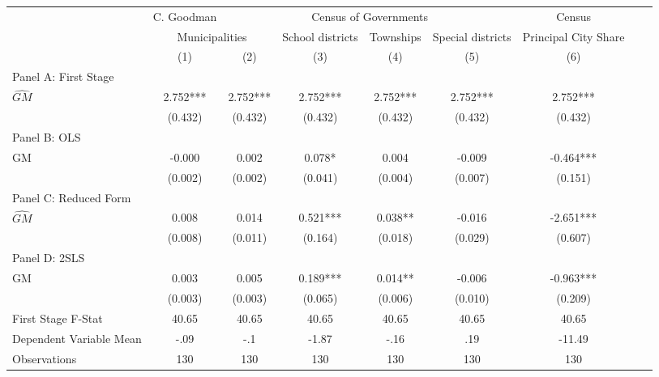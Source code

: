  \begin{tabular}{l*{8}{c}} \toprule
&\multicolumn{1}{c}{C. Goodman}&\multicolumn{4}{c}{Census of Governments}&\multicolumn{1}{c}{Census}\\\cmidrule(lr){2-2}\cmidrule(lr){3-6}\cmidrule(lr){7-7}
&\multicolumn{2}{c}{Municipalities}&\multicolumn{1}{c}{School districts}&\multicolumn{1}{c}{Townships}&\multicolumn{1}{c}{Special districts}&\multicolumn{1}{c}{Principal City Share}\\\cmidrule(lr){2-3}\cmidrule(lr){4-6}\cmidrule(lr){7-7}
&\multicolumn{1}{c}{(1)}&\multicolumn{1}{c}{(2)}&\multicolumn{1}{c}{(3)}&\multicolumn{1}{c}{(4)}&\multicolumn{1}{c}{(5)}&\multicolumn{1}{c}{(6)}\\
\cmidrule(lr){1-7}
\multicolumn{6}{l}{Panel A: First Stage}\\
\cmidrule(lr){1-7}
$\widehat{GM}$  &    2.752***&    2.752***&    2.752***&    2.752***&    2.752***&    2.752***\\
                &  (0.432)   &  (0.432)   &  (0.432)   &  (0.432)   &  (0.432)   &  (0.432)   \\
\cmidrule(lr){1-7}
\multicolumn{6}{l}{Panel B: OLS}\\
\cmidrule(lr){1-7}
GM              &   -0.000   &    0.002   &    0.078*  &    0.004   &   -0.009   &   -0.464***\\
                &  (0.002)   &  (0.002)   &  (0.041)   &  (0.004)   &  (0.007)   &  (0.151)   \\
\cmidrule(lr){1-7}
\multicolumn{6}{l}{Panel C: Reduced Form}\\
\cmidrule(lr){1-7}
$\widehat{GM}$  &    0.008   &    0.014   &    0.521***&    0.038** &   -0.016   &   -2.651***\\
                &  (0.008)   &  (0.011)   &  (0.164)   &  (0.018)   &  (0.029)   &  (0.607)   \\
\cmidrule(lr){1-7}
\multicolumn{6}{l}{Panel D: 2SLS}\\
\cmidrule(lr){1-7}
GM              &    0.003   &    0.005   &    0.189***&    0.014** &   -0.006   &   -0.963***\\
                &  (0.003)   &  (0.003)   &  (0.065)   &  (0.006)   &  (0.010)   &  (0.209)   \\
\midrule
First Stage F-Stat&    40.65   &    40.65   &    40.65   &    40.65   &    40.65   &    40.65   \\
Dependent Variable Mean&     -.09   &      -.1   &    -1.87   &     -.16   &      .19   &   -11.49   \\
Observations    &      130   &      130   &      130   &      130   &      130   &      130   \\
       \bottomrule \end{tabular}

